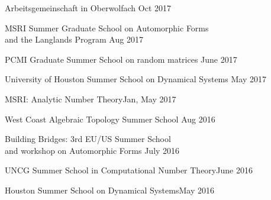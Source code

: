 \documentclass[margin,line,pifont,palatino,courier]{res}
\newenvironment{list1}{
  \begin{list}{\ding{113}}{%
      \setlength{\itemsep}{0in}
      \setlength{\parsep}{0in} \setlength{\parskip}{0in}
      \setlength{\topsep}{0in} \setlength{\partopsep}{0in}
      \setlength{\leftmargin}{0.17in}}}{\end{list}}
\begin{document}
\begin{resume}
\begin{list1}
\item {Arbeitsgemeinschaft in Oberwolfach} {\hfill  Oct 2017}

\item {MSRI Summer Graduate School on Automorphic Forms \\and the Langlands Program} {\hfill  Aug 2017}
 
 \item {PCMI Graduate Summer School on random matrices} {\hfill  June 2017}
 
\item { University of Houston Summer School on Dynamical Systems} {\hfill  May 2017}

\item {MSRI: Analytic Number Theory}{\hfill  Jan, May 2017}

\item { West Coast Algebraic Topology Summer School} {\hfill  Aug 2016}

\item { Building Bridges: 3rd EU/US Summer School \\and workshop on Automorphic Forms} {\hfill  July 2016}
 
\item  UNCG Summer School in Computational Number Theory{\hfill  June 2016}
 
\item  Houston Summer School on Dynamical Systems{\hfill  May 2016}


\end{list1}
\end{resume}
\end{document}
